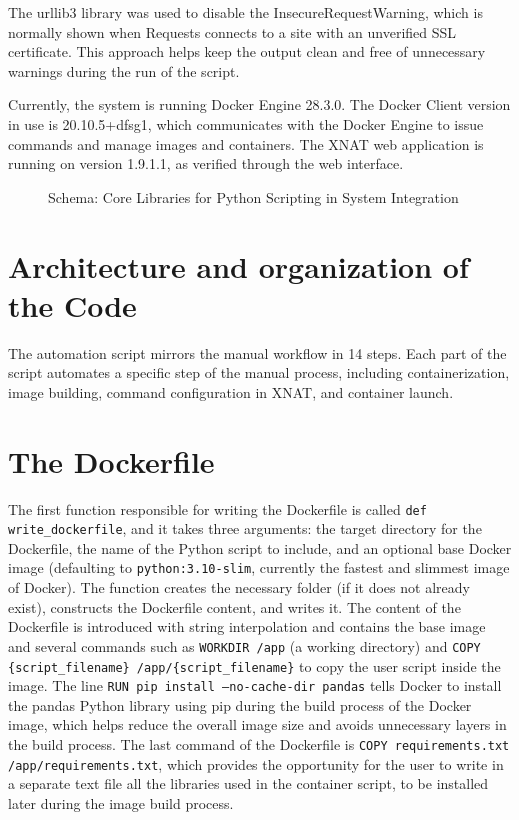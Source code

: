 The urllib3 library was used to disable the InsecureRequestWarning, which is normally shown when Requests connects to a site with an unverified SSL certificate. This approach helps keep the output clean and free of unnecessary warnings during the run of the script.

Currently, the system is running Docker Engine 28.3.0. The Docker Client version in use is 20.10.5+dfsg1, which communicates with the Docker Engine to issue commands and manage images and containers. The XNAT web application is running on version 1.9.1.1, as verified through the web interface.


\begin{figure}[ht]
  \centering
  \def\svgwidth{0.8\linewidth}
  
  \caption{Schema: Core Libraries for Python Scripting in System Integration}
  \label{fig:diagram-core-libraries}
\end{figure}


\section{Architecture and organization of the Code}
The automation script mirrors the manual workflow in 14 steps. Each part of the script automates a specific step of the manual process, including containerization, image building, command configuration in XNAT, and container launch.
 
  \section{The Dockerfile}
 
The first function responsible for writing the Dockerfile is called \texttt{def write\_dockerfile}, and it takes three arguments: the target directory for the Dockerfile, the name of the Python script to include, and an optional base Docker image (defaulting to \texttt{python:3.10-slim}, currently the fastest and slimmest image of Docker). The function creates the necessary folder (if it does not already exist), constructs the Dockerfile content, and writes it. The content of the Dockerfile is introduced with string interpolation and contains the base image and several commands such as \texttt{WORKDIR /app} (a working directory) and \texttt{COPY \{script\_filename\} /app/\{script\_filename\}} to copy the user script inside the image. The line \texttt{RUN pip install --no-cache-dir pandas} tells Docker to install the pandas Python library using pip during the build process of the Docker image, which helps reduce the overall image size and avoids unnecessary layers in the build process. The last command of the Dockerfile is \texttt{COPY requirements.txt /app/requirements.txt}, which provides the opportunity for the user to write in a separate text file all the libraries used in the container script, to be installed later during the image build process.


